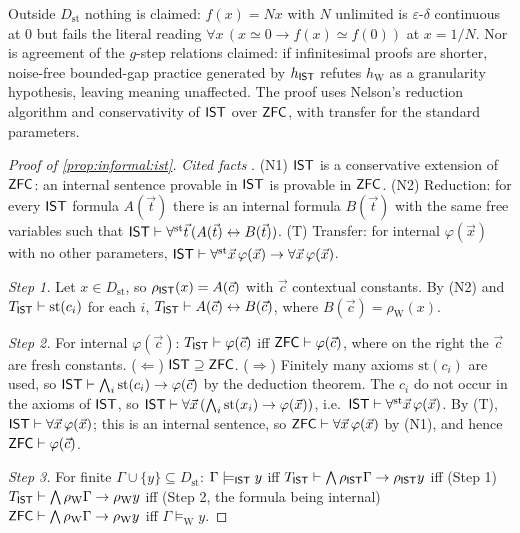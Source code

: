 Outside $D_{\mathrm{st}}$ nothing is claimed: $f(x)=Nx$ with $N$ unlimited is $\varepsilon$-$\delta$ continuous at $0$ but fails the literal reading $\forall x\,(x\simeq0\to f(x)\simeq f(0))$ at $x=1/N$. Nor is agreement of the $g$-step relations claimed: if infinitesimal proofs are shorter, noise-free bounded-gap practice generated by $h_{\mathsf{IST}}$ refutes $h_{\mathrm W}$ as a granularity hypothesis, leaving meaning unaffected. The proof uses Nelson's reduction algorithm and conservativity of $\mathsf{IST}$ over $\mathsf{ZFC}$, with transfer for the standard parameters.

\begin{proof}[Proof of \cref{prop:informal:ist}]
\emph{Cited facts} \citep{nelson1977internal}. (N1) $\mathsf{IST}$ is a conservative extension of $\mathsf{ZFC}$: an internal sentence provable in $\mathsf{IST}$ is provable in $\mathsf{ZFC}$. (N2) Reduction: for every $\mathsf{IST}$ formula $A(\vec t)$ there is an internal formula $B(\vec t)$ with the same free variables such that $\mathsf{IST}\vdash\forall^{\mathrm{st}}\vec t\,(A(\vec t)\leftrightarrow B(\vec t))$. (T) Transfer: for internal $\varphi(\vec x)$ with no other parameters, $\mathsf{IST}\vdash\forall^{\mathrm{st}}\vec x\,\varphi(\vec x)\to\forall\vec x\,\varphi(\vec x)$.

\emph{Step 1.} Let $x\in D_{\mathrm{st}}$, so $\rho_{\mathsf{IST}}(x)=A(\vec c)$ with $\vec c$ contextual constants. By (N2) and $T_{\mathsf{IST}}\vdash\mathrm{st}(c_i)$ for each $i$, $T_{\mathsf{IST}}\vdash A(\vec c)\leftrightarrow B(\vec c)$, where $B(\vec c)=\rho_{\mathrm W}(x)$.

\emph{Step 2.} For internal $\varphi(\vec c)$: $T_{\mathsf{IST}}\vdash\varphi(\vec c)$ iff $\mathsf{ZFC}\vdash\varphi(\vec c)$, where on the right the $\vec c$ are fresh constants. ($\Leftarrow$) $\mathsf{IST}\supseteq\mathsf{ZFC}$. ($\Rightarrow$) Finitely many axioms $\mathrm{st}(c_i)$ are used, so $\mathsf{IST}\vdash\bigwedge_i\mathrm{st}(c_i)\to\varphi(\vec c)$ by the deduction theorem. The $c_i$ do not occur in the axioms of $\mathsf{IST}$, so $\mathsf{IST}\vdash\forall\vec x\,(\bigwedge_i\mathrm{st}(x_i)\to\varphi(\vec x))$, i.e.\ $\mathsf{IST}\vdash\forall^{\mathrm{st}}\vec x\,\varphi(\vec x)$. By (T), $\mathsf{IST}\vdash\forall\vec x\,\varphi(\vec x)$; this is an internal sentence, so $\mathsf{ZFC}\vdash\forall\vec x\,\varphi(\vec x)$ by (N1), and hence $\mathsf{ZFC}\vdash\varphi(\vec c)$.

\emph{Step 3.} For finite $\Gamma\cup\{y\}\subseteq D_{\mathrm{st}}$: $\Gamma\models_{\mathsf{IST}}y$ iff $T_{\mathsf{IST}}\vdash\bigwedge\rho_{\mathsf{IST}}\Gamma\to\rho_{\mathsf{IST}}y$ iff (Step 1) $T_{\mathsf{IST}}\vdash\bigwedge\rho_{\mathrm W}\Gamma\to\rho_{\mathrm W}y$ iff (Step 2, the formula being internal) $\mathsf{ZFC}\vdash\bigwedge\rho_{\mathrm W}\Gamma\to\rho_{\mathrm W}y$ iff $\Gamma\models_{\mathrm W}y$.
\end{proof}

